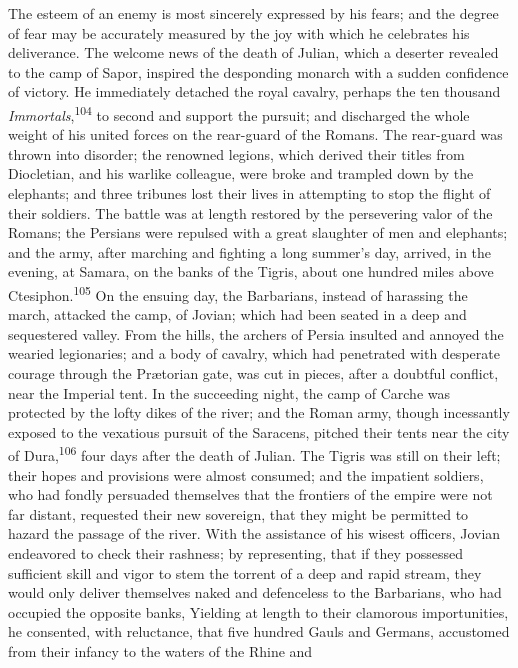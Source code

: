 The esteem of an enemy is most sincerely expressed by his fears;
and the degree of fear may be accurately measured by the joy with
which he celebrates his deliverance. The welcome news of the
death of Julian, which a deserter revealed to the camp of Sapor,
inspired the desponding monarch with a sudden confidence of
victory. He immediately detached the royal cavalry, perhaps the
ten thousand \textit{Immortals},\textsuperscript{104} to second and support the pursuit;
and discharged the whole weight of his united forces on the
rear-guard of the Romans. The rear-guard was thrown into
disorder; the renowned legions, which derived their titles from
Diocletian, and his warlike colleague, were broke and trampled
down by the elephants; and three tribunes lost their lives in
attempting to stop the flight of their soldiers. The battle was
at length restored by the persevering valor of the Romans; the
Persians were repulsed with a great slaughter of men and
elephants; and the army, after marching and fighting a long
summer’s day, arrived, in the evening, at Samara, on the banks of
the Tigris, about one hundred miles above Ctesiphon.\textsuperscript{105} On the
ensuing day, the Barbarians, instead of harassing the march,
attacked the camp, of Jovian; which had been seated in a deep and
sequestered valley. From the hills, the archers of Persia
insulted and annoyed the wearied legionaries; and a body of
cavalry, which had penetrated with desperate courage through the
Prætorian gate, was cut in pieces, after a doubtful conflict,
near the Imperial tent. In the succeeding night, the camp of
Carche was protected by the lofty dikes of the river; and the
Roman army, though incessantly exposed to the vexatious pursuit
of the Saracens, pitched their tents near the city of Dura,\textsuperscript{106}
four days after the death of Julian. The Tigris was still on
their left; their hopes and provisions were almost consumed; and
the impatient soldiers, who had fondly persuaded themselves that
the frontiers of the empire were not far distant, requested their
new sovereign, that they might be permitted to hazard the passage
of the river. With the assistance of his wisest officers, Jovian
endeavored to check their rashness; by representing, that if they
possessed sufficient skill and vigor to stem the torrent of a
deep and rapid stream, they would only deliver themselves naked
and defenceless to the Barbarians, who had occupied the opposite
banks, Yielding at length to their clamorous importunities, he
consented, with reluctance, that five hundred Gauls and Germans,
accustomed from their infancy to the waters of the Rhine and
